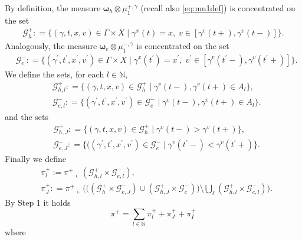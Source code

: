 \documentclass[11pt, twoside, reqno]{amsart}
\theoremstyle{definition}
\theoremstyle{remark}
\numberwithin{equation}{section}
\newcommand{\mc}[1]{\mathcal{#1}}
\newcommand{\bs}[1]{\boldsymbol{#1}}
\begin{document}
By definition, the measure $\bs \omega_h \otimes \mu_1^{+, \gamma}$ (recall also \eqref{eq:mu1def}) is concentrated  on the set 
\begin{equation}
\begin{aligned}
    \mc G_h^+ : = \Big\{(\gamma, t, x, v) \in \Gamma \times X \; \Big| \; \gamma^x(t) = x, \; v \in [\gamma^v(t+), \gamma^v(t-)]\Big\}.
    \end{aligned}
\end{equation}
Analogously, the measure $\bs \omega_e \otimes \mu_1^{-, \gamma}$  is concentrated  on the set 
\begin{equation}
\begin{aligned}
    & \mc G_e^- : = \Big\{(\gamma^{\prime}, t^{\prime}, x^{\prime}, v^{\prime}) \in \Gamma \times X \;\Big| \; \gamma^x(t^\prime) = x^\prime, \; v^\prime \in [\gamma^v(t^\prime-), \gamma^v(t^\prime+)]\Big\}.
    \end{aligned}
\end{equation}
We define the sets, for each $l \in \mathbb N$,
\begin{equation}
\begin{aligned}
    & \mc G^+_{h, l} : = \Big\{(\gamma, t, x, v) \in \mc G^+_h \; \Big| \; \gamma^v(t-), \gamma^v(t+) \in A_l\Big\},\\
& \mc G^-_{e, l} : = \Big\{(\gamma^{\prime}, t^{\prime}, x^{\prime}, v^{\prime}) \in \mc G^-_e \; \Big| \; \gamma^v(t-), \gamma^v(t+) \in A_l\Big\}.
    \end{aligned}
\end{equation}
and the sets
\begin{equation}
    \begin{aligned}
  & \mc G^+_{h, J} : = \Big\{(\gamma, t, x, v) \in \mc G^+_h \; \Big| \; \gamma^v(t-)> \gamma^v(t+) \Big\},\\
& \mc G^-_{e, J} : = \Big\{((\gamma^{\prime}, t^{\prime}, x^{\prime}, v^{\prime})\in \mc G^-_e \; \Big| \; \gamma^v(t^\prime-)< \gamma^v(t^\prime+) \Big\}.
    \end{aligned}
\end{equation}
Finally we define
\begin{equation}
\begin{aligned}
    & \pi^+_l := \pi^+ \llcorner (  \mc G^+_{h, l} \times \mc G^-_{e, l}), \\
    & \pi^+_J : = \pi^+ \llcorner \Bigg( \Big((\mc G_h^+\times \mc G^-_{e, J} ) \cup ( \mc G^+_{h, J} \times \mc G_e^-)\Big) \setminus \bigcup_{\ell}  ( \mc G^+_{h, l} \times \mc G^-_{e, l}) \Bigg).
    \end{aligned}
\end{equation}
By Step 1 it holds
$$
\pi^+ = \sum_{l \in\mathbb N} \pi^+_l + \pi^+_{J} + \pi^+_I
$$
where 
\end{document}
